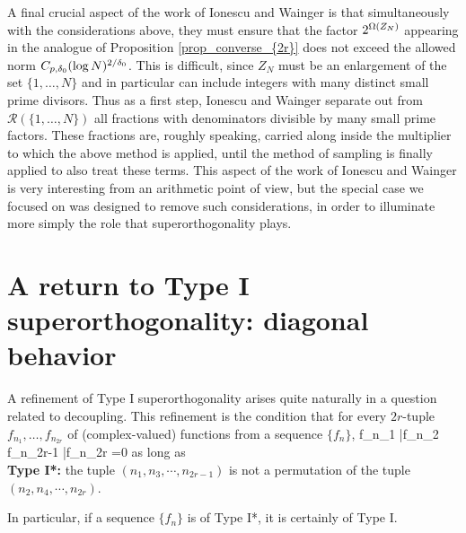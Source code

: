 \documentclass[oneside,11pt]{amsart}
\newcommand{\Rcal}{\mathcal{R}}
\begin{document}
 
A final crucial aspect of the work of  Ionescu and Wainger is that simultaneously with the considerations above, they  must ensure that the factor $2^{\Omega(Z_N)}$ appearing in the analogue of Proposition \ref{prop_converse_{2r}} does not exceed the allowed   norm $C_{p,\delta_0}(\log N)^{2/\delta_0}$. This is difficult, since $Z_N$ must be an enlargement of the set $\{1,\ldots,N\}$ and in particular can include integers with many distinct small prime divisors. Thus as a first step, Ionescu and Wainger separate out from $\Rcal( \{1,\ldots, N\})$ all fractions with denominators divisible by many small prime factors. These fractions  are, roughly speaking, carried along inside the multiplier to which the above method is applied, until the method of sampling is finally applied to also treat these terms. This aspect of the work of Ionescu and Wainger is very interesting from an arithmetic point of view, but the special case we focused on was designed to remove such considerations, in order to illuminate more simply the role that superorthogonality plays.

 
 
 
 
\section{A return to Type I superorthogonality: diagonal behavior}\label{sec_decoupling}

A refinement of Type I superorthogonality arises quite naturally in a question related to decoupling. This refinement is the condition that for every $2r$-tuple $f_{n_1}, \ldots, f_{n_{2r}}$ of (complex-valued) functions from a sequence   $\{f_n\}$,
\beq\label{TIII_vanish'}
\int f_{n_1} \bar{f}_{n_2} \cdots f_{n_{2r-1}} \bar{f}_{n_{2r}}  =0
\eeq
as long as \\
{\bf Type I*:} the tuple $(n_1, n_3 ,\cdots , n_{2r-1})$ is not a permutation of the tuple $(n_2,n_4, \cdots, n_{2r})$.

 In particular, if a sequence $\{f_n\}$ is of Type I*, it is certainly of Type I.
 
\end{document}

